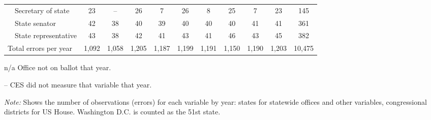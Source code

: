 \begin{table}[!htbp]
{\begin{threeparttable}
\begin{tabular}{lcccccccccc}
~~Secretary of state & 23 & -- & 26 & 7 & 26 & 8 & 25 & 7 & 23 & 145 \\
~~State senator & 42 & 38 & 40 & 39 & 40 & 40 & 40 & 41 & 41 & 361 \\
~~State representative & 43 & 38 & 42 & 41 & 43 & 41 & 46 & 43 & 45 & 382 \\
\midrule
Total errors per year & 1,092 & 1,058 & 1,205 & 1,187 & 1,199 & 1,191 & 1,150 & 1,190 & 1,203 & 10,475 \\
\bottomrule
\end{tabular}
\begin{tablenotes}
\footnotesize
\item n/a Office not on ballot that year.
\item -- CES did not measure that variable that year.
\item \textit{Note:} Shows the number of observations (errors) for each variable by year: states for statewide offices and other variables, congressional districts for US House. Washington D.C. is counted as the 51st state.
\end{tablenotes}
\end{threeparttable}%
}
\end{table}
